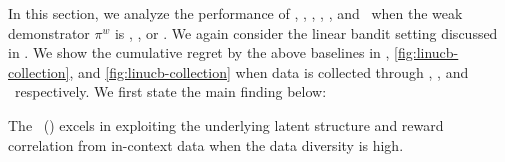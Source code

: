 In this section, we analyze the performance of \pred, \predt, \dptg, \ad, \ts, and \linucb\ when the weak demonstrator $\pi^w$ is \ts, \linucb, or \unif. We again consider the linear bandit setting discussed in . 
We show the cumulative regret by the above baselines in , \ref{fig:linucb-collection}, and \ref{fig:linucb-collection} when data is collected through \ts, \linucb, and \unif\ respectively. We first state the main finding below:
%
%
\begin{tcolorbox}
    \customfinding The \pred\ (\gt) excels in exploiting the underlying latent structure and reward correlation from in-context data when the data diversity is high.
\end{tcolorbox}
%
%
%
%
